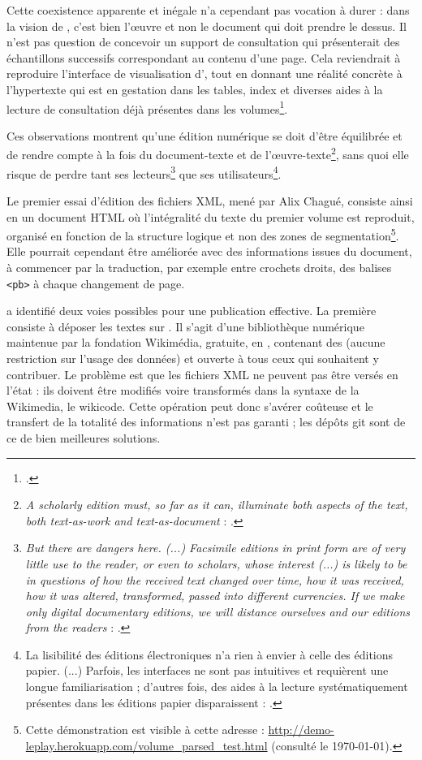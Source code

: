 Cette coexistence apparente et inégale n'a cependant pas vocation à durer : dans la vision de \timeus, c'est bien l'\oe{}uvre et non le document qui doit prendre le dessus. Il n'est pas question de concevoir un support de consultation qui présenterait des échantillons successifs correspondant au contenu d'une page. Cela reviendrait à reproduire l'interface de visualisation d'\ia, tout en donnant une réalité concrète à l'hypertexte qui est \og en gestation dans les tables, index et diverses aides à la lecture de consultation déjà présentes \fg{} dans les volumes\footcite[p. 19]{duval}.

Ces observations montrent qu'une édition numérique se doit d'être équilibrée et de rendre compte à la fois du document-texte et de l'\oe{}uvre-texte\footnote{\og \textit{A scholarly edition must, so far as it can, illuminate both aspects of the text, both text-as-work and text-as-document} \fg{} : \cite[p. 123]{robinson}.}, sans quoi elle risque de perdre tant ses lecteurs\footnote{\og \textit{But there are dangers here. (...) Facsimile editions in print form are of very little use to the reader, or even to scholars, whose interest (...) is likely to be in questions of how the received text changed over time, how it was received, how it was altered, transformed, passed into different currencies. If we make only digital documentary editions, we will distance ourselves and our editions from the readers} \fg{} : \cite[p. 127]{robinson}.} que ses utilisateurs\footnote{\og La lisibilité des éditions électroniques n’a rien à envier à celle des éditions papier. (...) Parfois, les interfaces ne sont pas intuitives et requièrent une longue familiarisation ; d’autres fois, des aides à la lecture systématiquement présentes dans les éditions papier disparaissent \fg{} : \cite[p. 21]{duval}.}.

Le premier essai d'édition des fichiers XML, mené par Alix Chagué, consiste ainsi en un document HTML où l'intégralité du texte du premier volume est reproduit, organisé en fonction de la structure logique et non des zones de segmentation\footnote{Cette démonstration est visible à cette adresse : \url{http://demo-leplay.herokuapp.com/volume_parsed_test.html} (consulté le \today).}. Elle pourrait cependant être améliorée avec des informations issues du document, à commencer par la traduction, par exemple entre crochets droits, des balises \texttt{<pb>} à chaque changement de page.

\timeus{} a identifié deux voies possibles pour une publication effective. La première consiste à déposer les textes sur \wikisource. Il s'agit d'une bibliothèque numérique maintenue par la fondation Wikimédia, gratuite, en \openaccess, contenant des \opendata{} (aucune restriction sur l'usage des données) et ouverte à tous ceux qui souhaitent y contribuer. Le problème est que les fichiers XML ne peuvent pas être versés en l'état : ils doivent être modifiés voire transformés dans la syntaxe de la Wikimedia, le wikicode. Cette opération peut donc s'avérer coûteuse et le transfert de la totalité des informations n'est pas garanti ; les dépôts git sont de ce \pov{} de bien meilleures solutions.

